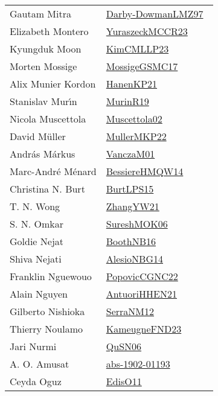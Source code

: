 {\begin{longtable}{p{4cm}p{20cm}}
Gautam Mitra & \href{articles/Darby-DowmanLMZ97.pdf}{Darby-DowmanLMZ97}~\cite{Darby-DowmanLMZ97}\\
Elizabeth Montero & \href{articles/YuraszeckMCCR23.pdf}{YuraszeckMCCR23}~\cite{YuraszeckMCCR23}\\
Kyungduk Moon & \href{papers/KimCMLLP23.pdf}{KimCMLLP23}~\cite{KimCMLLP23}\\
Morten Mossige & \href{papers/MossigeGSMC17.pdf}{MossigeGSMC17}~\cite{MossigeGSMC17}\\
Alix Munier Kordon & \href{papers/HanenKP21.pdf}{HanenKP21}~\cite{HanenKP21}\\
Stanislav Mur{\'{\i}}n & \href{papers/MurinR19.pdf}{MurinR19}~\cite{MurinR19}\\
Nicola Muscettola & \href{papers/Muscettola02.pdf}{Muscettola02}~\cite{Muscettola02}\\
David M{\"{u}}ller & \href{articles/MullerMKP22.pdf}{MullerMKP22}~\cite{MullerMKP22}\\
Andr{\'{a}}s M{\'{a}}rkus & \href{papers/VanczaM01.pdf}{VanczaM01}~\cite{VanczaM01}\\
Marc{-}Andr{\'{e}} M{\'{e}}nard & \href{papers/BessiereHMQW14.pdf}{BessiereHMQW14}~\cite{BessiereHMQW14}\\
Christina N. Burt & \href{papers/BurtLPS15.pdf}{BurtLPS15}~\cite{BurtLPS15}\\
T. N. Wong & \href{articles/ZhangYW21.pdf}{ZhangYW21}~\cite{ZhangYW21}\\
S. N. Omkar & \href{}{SureshMOK06}~\cite{SureshMOK06}\\
Goldie Nejat & \href{papers/BoothNB16.pdf}{BoothNB16}~\cite{BoothNB16}\\
Shiva Nejati & \href{papers/AlesioNBG14.pdf}{AlesioNBG14}~\cite{AlesioNBG14}\\
Franklin Nguewouo & \href{papers/PopovicCGNC22.pdf}{PopovicCGNC22}~\cite{PopovicCGNC22}\\
Alain Nguyen & \href{papers/AntuoriHHEN21.pdf}{AntuoriHHEN21}~\cite{AntuoriHHEN21}\\
Gilberto Nishioka & \href{papers/SerraNM12.pdf}{SerraNM12}~\cite{SerraNM12}\\
Thierry Noulamo & \href{papers/KameugneFND23.pdf}{KameugneFND23}~\cite{KameugneFND23}\\
Jari Nurmi & \href{papers/QuSN06.pdf}{QuSN06}~\cite{QuSN06}\\
A. O. Amusat & \href{articles/abs-1902-01193.pdf}{abs-1902-01193}~\cite{abs-1902-01193}\\
Ceyda Oguz & \href{papers/EdisO11.pdf}{EdisO11}~\cite{EdisO11}\\

\end{longtable}}

